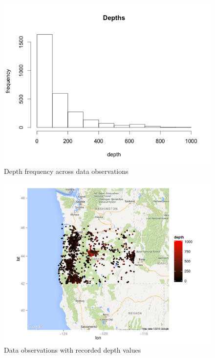 \documentclass[12pt,twoside]{reedthesis}
\begin{document}
\begin{figure}[h!]
	   
	       \centering
	  
	    \includegraphics[scale=0.6]{depth_hist}
	
	     \caption{Depth frequency across data observations}
	 \label{depths}
	\end{figure}

\begin{figure}[h!]
	   
	       \centering
	  
	    \includegraphics[scale=0.8]{points_plot}
	
	     \caption{Data observations with recorded depth values}
	 \label{points}
	\end{figure}
\end{document}
